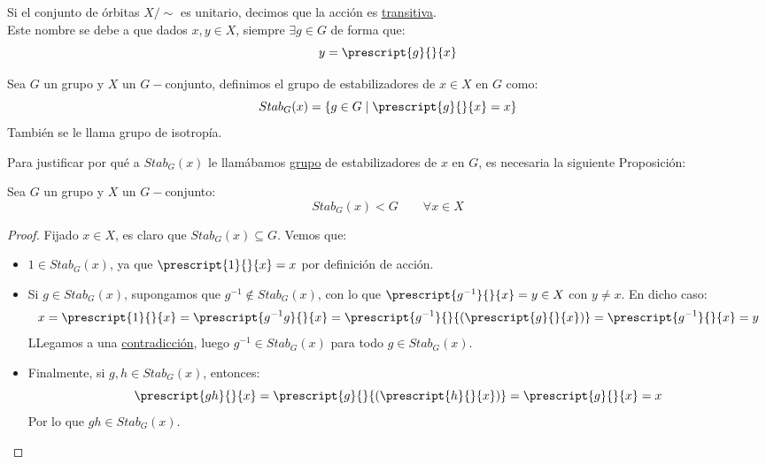 \begin{definicion}
    Si el conjunto de órbitas $X/\sim$ es unitario, decimos que la acción es \underline{transitiva}.\\

    \noindent
    Este nombre se debe a que dados $x,y\in X$, siempre $\exists g\in G$ de forma que:
    \begin{equation*}
        y = \prescript{g}{}{x}
    \end{equation*}
\end{definicion}

\begin{definicion}[Estabilizador]
    Sea $G$ un grupo y $X$ un $G-$conjunto, definimos el grupo de estabilizadores de $x\in X$ en $G$ como:
    \begin{equation*}
        Stab_G(x) = \{g\in G \mid \prescript{g}{}{x} = x\}
    \end{equation*}
    También se le llama grupo de isotropía.
\end{definicion}

\noindent
Para justificar por qué a $Stab_G(x)$ le llamábamos \underline{grupo} de estabilizadores de $x$ en $G$, es necesaria la siguiente Proposición:
\begin{prop}
    Sea $G$ un grupo y $X$ un $G-$conjunto:
    \begin{equation*}
        Stab_G(x) < G \qquad \forall x\in X
    \end{equation*}
    \begin{proof}
        Fijado $x\in X$, es claro que $Stab_G(x) \subseteq G$. Vemos que:
        \begin{itemize}
            \item $1\in Stab_G(x)$, ya que $\prescript{1}{}{x} = x$ por definición de acción.
            \item Si $g\in Stab_G(x)$, supongamos que $g^{-1}\notin Stab_G(x)$, con lo que $\prescript{g^{-1}}{}{x} = y \in X$ con $y\neq x$. En dicho caso:
                \begin{equation*}
                    x = \prescript{1}{}{x} = \prescript{g^{-1}g}{}{x} = \prescript{g^{-1}}{}{(\prescript{g}{}{x})} = \prescript{g^{-1}}{}{x} = y
                \end{equation*}
                LLegamos a una \underline{contradicción}, luego $g^{-1}\in Stab_G(x)$ para todo $g\in Stab_G(x)$.
            \item Finalmente, si $g,h\in Stab_G(x)$, entonces:
                \begin{equation*}
                    \prescript{gh}{}{x} = \prescript{g}{}{(\prescript{h}{}{x})} = \prescript{g}{}{x} = x
                \end{equation*}
                Por lo que $gh \in Stab_G(x)$.
        \end{itemize}
    \end{proof}
\end{prop}

